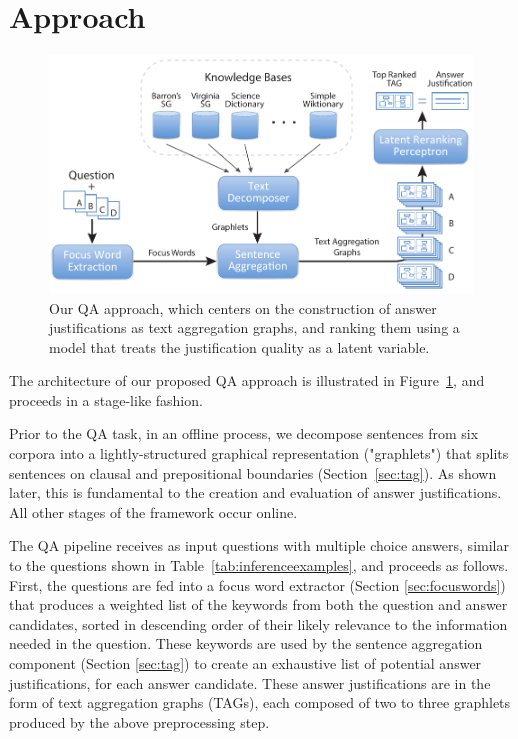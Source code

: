\section{Approach}
\label{sec:approach}

\begin{figure}[t!]
\centering

\includegraphics[width=1.0\textwidth]{tag_architecture6c.pdf}

\caption{Our QA approach, which centers on the construction of answer justifications as text aggregation graphs, and ranking them using a model that treats the justification quality as a latent variable.}
\label{fig:architecture}
\end{figure}

The architecture of our proposed QA approach is illustrated in Figure~\ref{fig:architecture}, and proceeds in a stage-like fashion.  

Prior to the QA task, in an offline process, we decompose sentences from six corpora into a lightly-structured graphical representation ("graphlets") that splits sentences on clausal and prepositional boundaries (Section~\ref{sec:tag}). As shown later, this is fundamental to the creation and evaluation of answer justifications.  All other stages of the framework occur online. 

The QA pipeline receives as input questions with multiple choice answers, similar to the questions shown in Table~\ref{tab:inferenceexamples}, and proceeds as follows. First, the questions are fed into a focus word extractor (Section \ref{sec:focuswords}) that produces a weighted list of the keywords from both the question and answer candidates, sorted in descending order of their likely relevance to the information needed in the question. These keywords are used by the sentence aggregation component (Section \ref{sec:tag}) to create an exhaustive list of potential answer justifications, for each answer candidate.  These answer justifications are in the form of text aggregation graphs (TAGs), each composed of two to three graphlets produced by the above preprocessing step.


